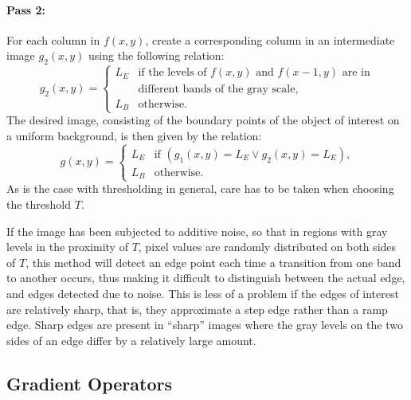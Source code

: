 \paragraph{Pass 2:} For each column in $f(x,y)$, create a
corresponding column in an intermediate image $g_{2}(x,y)$ using the
following relation:
\begin{equation}
  g_{2}(x,y)=\left\{
    \begin{array}{ll}
      L_{E} & \mbox{if the levels of $f(x,y)$ and $f(x-1,y)$ are in} \\
            & \mbox{different bands of the gray scale,} \\
      L_{B} & \mbox{otherwise.}
    \end{array}\right.
\end{equation}
The desired image, consisting of the boundary points of the object of
interest on a uniform background, is then given by the relation:
\begin{equation}
  g(x,y)=\left\{
    \begin{array}{ll}
      L_{E} & \mbox{if $(g_{1}(x,y)=L_{E}\vee g_{2}(x,y)=L_{E})$,} \\
      L_{B} & \mbox{otherwise.}
    \end{array}\right.
\end{equation}
As is the case with thresholding in general, care has to be taken when
choosing the threshold $T$.  

If the image has been subjected to additive noise, so that in regions
with gray levels in the proximity of $T$, pixel values are randomly
distributed on both sides of $T$, this method will detect an edge
point each time a transition from one band to another occurs, thus
making it difficult to distinguish between the actual edge, and edges
detected due to noise.  This is less of a problem if the edges of
interest are relatively sharp, that is, they approximate a step edge
rather than a ramp edge.  Sharp edges are present in ``sharp'' images
where the gray levels on the two sides of an edge differ by a
relatively large amount.

\subsection{Gradient Operators}
\label{image:edge:gradient}

